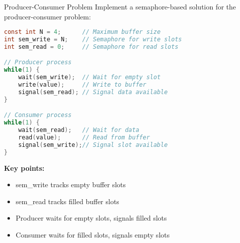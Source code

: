 \begin{example2}{Producer-Consumer Problem}
    Implement a semaphore-based solution for the producer-consumer problem:

    \begin{minipage}{0.56\linewidth}

\begin{lstlisting}[language=C, style=basesmol]
const int N = 4;      // Maximum buffer size
int sem_write = N;    // Semaphore for write slots
int sem_read = 0;     // Semaphore for read slots

// Producer process
while(1) {
    wait(sem_write);  // Wait for empty slot
    write(value);     // Write to buffer
    signal(sem_read); // Signal data available
}

// Consumer process  
while(1) {
    wait(sem_read);   // Wait for data
    read(value);      // Read from buffer
    signal(sem_write);// Signal slot available
}
\end{lstlisting}
    \end{minipage}
    \hspace{2mm}
    \begin{minipage}{0.4\linewidth}
    \textbf{Key points:}
    \begin{itemize}
        \item sem\_write tracks empty buffer slots
        \item sem\_read tracks filled buffer slots
        \item Producer waits for empty slots, signals filled slots
        \item Consumer waits for filled slots, signals empty slots
    \end{itemize}
    \end{minipage}
\end{example2}


